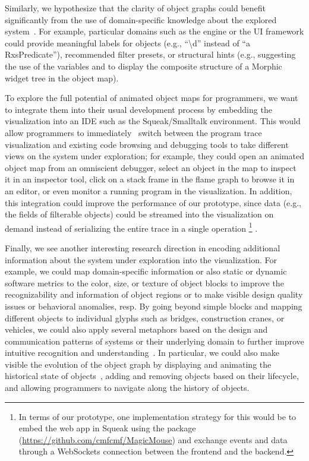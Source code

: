 Similarly, we hypothesize that the clarity of object graphs could benefit significantly from the use of domain-specific knowledge about the explored system~\cite{chis2014moldable}.
For example, particular domains such as the  engine or the  UI framework could provide meaningful labels for objects (e.g., ``\textbackslash{}d'' instead of ``a RxsPredicate''), recommended filter presets, or structural hints (e.g., suggesting the use of the variables  and  to display the composite structure of a Morphic widget tree in the object map).

To explore the full potential of animated object maps for programmers, we want to integrate them into their usual development process by embedding the visualization into an IDE such as the Squeak/Smalltalk environment.
This would allow programmers to immediately~\cite{ungar1997debugging} switch between the program trace visualization and existing code browsing and debugging tools to take different views on the system under exploration; for example, they could open an animated object map from an omniscient debugger, select an object in the map to inspect it in an inspector tool, click on a stack frame in the flame graph to browse it in an editor, or even monitor a running program in the visualization.
In addition, this integration could improve the performance of our prototype, since data (e.g., the fields of filterable objects) could be streamed into the visualization on demand instead of serializing the entire trace in a single operation%
\footnote{In terms of our \tfd{} prototype, one implementation strategy for this would be to embed the web app in Squeak using the  package (\url{https://github.com/cmfcmf/MagicMouse}) and exchange events and data through a WebSockets connection between the frontend and the backend.}%
.

Finally, we see another interesting research direction in encoding additional information about the system under exploration into the visualization.
For example, we could map domain-specific information or also static or dynamic software metrics to the color, size, or texture of object blocks to improve the recognizability and information of object regions or to make visible design quality issues or behavioral anomalies, resp.
By going beyond simple blocks and mapping different objects to individual glyphs such as bridges, construction cranes, or vehicles, we could also apply several metaphors based on the design and communication patterns of systems or their underlying domain to further improve intuitive recognition and understanding~\cite{cheng2008xdiva,wurfel2015natural}.
In particular, we could also make visible the evolution of the object graph by displaying and animating the historical state of objects~\cite{thiede2023object,thiede2023time}, adding and removing objects based on their lifecycle, and allowing programmers to navigate along the history of objects.
